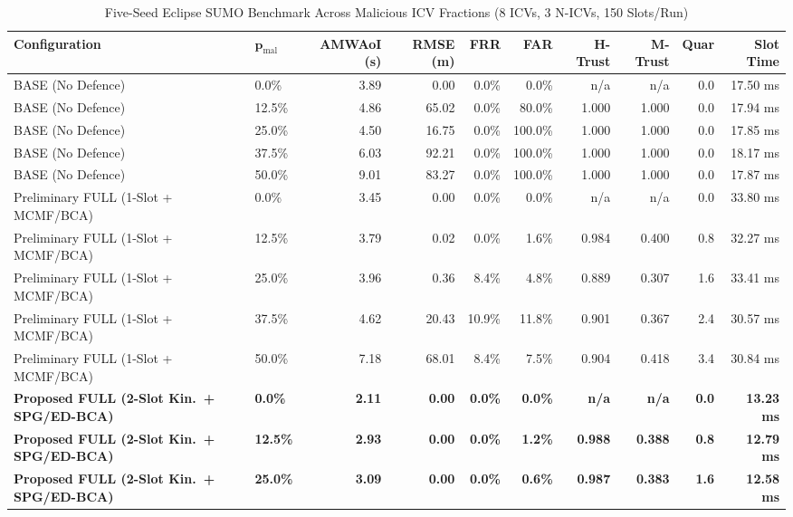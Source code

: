 \documentclass[conference]{IEEEtran}
\begin{document}
\begin{table}[t]
\caption{Five-Seed Eclipse SUMO Benchmark Across Malicious ICV Fractions (8 ICVs, 3 N-ICVs, 150 Slots/Run)}
\begin{center}
\small
\begin{tabular}{llrrrrrrrr}
\toprule
\textbf{Configuration} & $\boldsymbol{p_{\mathrm{mal}}}$ & \textbf{AMWAoI (s)} & \textbf{RMSE (m)} & \textbf{FRR} & \textbf{FAR} & \textbf{H-Trust} & \textbf{M-Trust} & \textbf{Quar} & \textbf{Slot Time}\\
\midrule
BASE (No Defence) & 0.0\%  & 3.89 & 0.00  & 0.0\% & 0.0\%   & n/a   & n/a   & 0.0 & 17.50 ms\\
BASE (No Defence) & 12.5\% & 4.86 & 65.02 & 0.0\% & 80.0\%  & 1.000 & 1.000 & 0.0 & 17.94 ms\\
BASE (No Defence) & 25.0\% & 4.50 & 16.75 & 0.0\% & 100.0\% & 1.000 & 1.000 & 0.0 & 17.85 ms\\
BASE (No Defence) & 37.5\% & 6.03 & 92.21 & 0.0\% & 100.0\% & 1.000 & 1.000 & 0.0 & 18.17 ms\\
BASE (No Defence) & 50.0\% & 9.01 & 83.27 & 0.0\% & 100.0\% & 1.000 & 1.000 & 0.0 & 17.87 ms\\
\midrule
Preliminary FULL (1-Slot + MCMF/BCA) & 0.0\%  & 3.45 & 0.00  & 0.0\%  & 0.0\%  & n/a   & n/a   & 0.0 & 33.80 ms\\
Preliminary FULL (1-Slot + MCMF/BCA) & 12.5\% & 3.79 & 0.02  & 0.0\%  & 1.6\%  & 0.984 & 0.400 & 0.8 & 32.27 ms\\
Preliminary FULL (1-Slot + MCMF/BCA) & 25.0\% & 3.96 & 0.36  & 8.4\%  & 4.8\%  & 0.889 & 0.307 & 1.6 & 33.41 ms\\
Preliminary FULL (1-Slot + MCMF/BCA) & 37.5\% & 4.62 & 20.43 & 10.9\% & 11.8\% & 0.901 & 0.367 & 2.4 & 30.57 ms\\
Preliminary FULL (1-Slot + MCMF/BCA) & 50.0\% & 7.18 & 68.01 & 8.4\%  & 7.5\%  & 0.904 & 0.418 & 3.4 & 30.84 ms\\
\midrule
\textbf{Proposed FULL (2-Slot Kin.\ + SPG/ED-BCA)} & \textbf{0.0\%}  & \textbf{2.11} & \textbf{0.00} & \textbf{0.0\%} & \textbf{0.0\%} & \textbf{n/a}   & \textbf{n/a}   & \textbf{0.0} & \textbf{13.23 ms}\\
\textbf{Proposed FULL (2-Slot Kin.\ + SPG/ED-BCA)} & \textbf{12.5\%} & \textbf{2.93} & \textbf{0.00} & \textbf{0.0\%} & \textbf{1.2\%} & \textbf{0.988} & \textbf{0.388} & \textbf{0.8} & \textbf{12.79 ms}\\
\textbf{Proposed FULL (2-Slot Kin.\ + SPG/ED-BCA)} & \textbf{25.0\%} & \textbf{3.09} & \textbf{0.00} & \textbf{0.0\%} & \textbf{0.6\%} & \textbf{0.987} & \textbf{0.383} & \textbf{1.6} & \textbf{12.58 ms}\\

\end{tabular}
\end{center}
\end{table}
\end{document}
